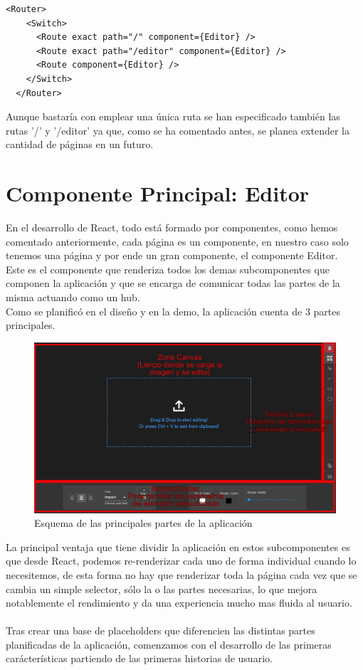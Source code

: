 \begin{lstlisting}[caption={Componente Router de App.js}]
  <Router>
    <Switch>
      <Route exact path="/" component={Editor} />
      <Route exact path="/editor" component={Editor} />
      <Route component={Editor} />
    </Switch>
  </Router>
\end{lstlisting}

Aunque bastaría con emplear una única ruta se han especificado también las rutas '/' y '/editor' 
ya que, como se ha comentado antes, se planea extender la cantidad de páginas en un futuro.

\section{Componente Principal: Editor}

En el desarrollo de React, todo está formado por componentes, como hemos comentado anteriormente,
cada página es un componente, en nuestro caso solo tenemos una página y por ende un gran componente,
el componente Editor.
\\
Este es el componente que renderiza todos los demas subcomponentes que componen la aplicación
y que se encarga de comunicar todas las partes de la misma actuando como un hub.
\\
Como se planificó en el diseño y en la demo, la aplicación cuenta de 3 partes principales.

\begin{figure}[!h]
  \centering
  \includegraphics[scale=0.30]{img/ESQUEMA_PARTES.png}
  \caption{Esquema de las principales partes de la aplicación}
\end{figure}

\newpage
La principal ventaja que tiene dividir la aplicación en estos subcomponentes es que desde
React, podemos re-renderizar cada uno de forma individual cuando lo necesitemos, de esta forma
no hay que renderizar toda la página cada vez que se cambia un simple selector, sólo la o las
partes necesarias, lo que mejora notablemente el rendimiento y da una experiencia mucho mas
fluida al usuario.
\\\\
Tras crear una base de placeholders que diferencien las distintas partes planificadas
de la aplicación, comenzamos con el desarrollo de las primeras carácterísticas 
partiendo de las primeras historias de usuario.

